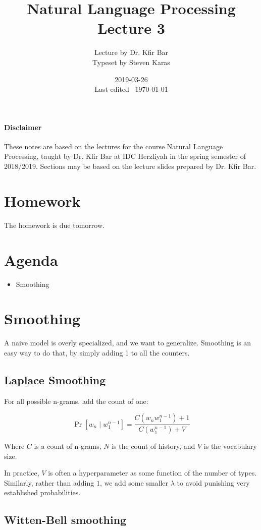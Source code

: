 \documentclass{idc_msc}
\title{Natural Language Processing \\\large Lecture 3}
\date{2019-03-26 \\ Last edited \currenttime\ \today}
\author{Lecture by Dr. Kfir Bar\\Typeset by Steven Karas}
\begin{document}
\paragraph{Disclaimer}

These notes are based on the lectures for the course Natural Language Processing, taught by Dr. Kfir Bar at IDC Herzliyah in the spring semester of 2018/2019.
Sections may be based on the lecture slides prepared by Dr. Kfir Bar.

\nocite{Jurafsky:2009:SLP:0131873210}
\nocite{manning1999foundations}
\nocite{DBLP:journals/corr/Goldberg15c}

\section{Homework}

The homework is due tomorrow.

\section{Agenda}

\begin{itemize}
  \item Smoothing
\end{itemize}

\section{Smoothing}

A naive model is overly specialized, and we want to generalize.
Smoothing is an easy way to do that, by simply adding 1 to all the counters.

\subsection{Laplace Smoothing}

For all possible n-grams, add the count of one:

\[
  \Pr[w_n \mid w_1^{n-1}] = \frac{C(w_n w_1^{n-1}) + 1}{C(w_1^{n-1}) + V}
\]

Where \(C\) is a count of n-grams, \(N\) is the count of history, and \(V\) is the vocabulary size.

In practice, \(V\) is often a hyperparameter as some function of the number of types.
Similarly, rather than adding \(1\), we add some smaller \(\lambda\) to avoid punishing very established probabilities.

\subsection{Witten-Bell smoothing}
\end{document}
